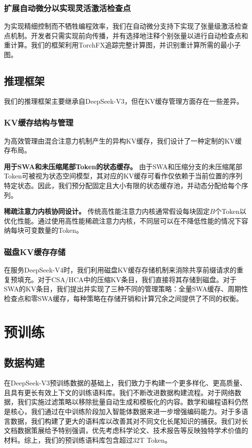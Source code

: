 \documentclass[11pt,a4paper]{article}
\newcommand{\dsvfour}{DeepSeek-V4}
\newcommand{\dsvthree}{DeepSeek-V3}
\begin{document}
\subsubsection{扩展自动微分以实现灵活激活检查点}
为实现精细控制而不牺牲编程效率，我们在自动微分支持下实现了张量级激活检查点机制。开发者只需实现前向传播，并有选择地注释个别张量以进行自动检查点和重计算。我们的框架利用TorchFX追踪完整计算图，并识别重计算所需的最小子图。

\subsection{推理框架}
我们的推理框架主要继承自\dsvthree，但在KV缓存管理方面存在一些差异。

\subsubsection{KV缓存结构与管理}
为高效管理由混合注意力机制产生的异构KV缓存，我们设计了一种定制的KV缓存布局。

\textbf{用于SWA和未压缩尾部Token的状态缓存。} 由于SWA和压缩分支的未压缩尾部Token可被视为状态空间模型，其对应的KV缓存可看作仅依赖于当前位置的序列特定状态。因此，我们预分配固定且大小有限的状态缓存池，并动态分配给每个序列。

\textbf{稀疏注意力内核协同设计。} 传统高性能注意力内核通常假设每块固定\(B\)个Token以优化性能。通过使用高性能稀疏注意力内核，不同层可以在不降低性能的情况下容纳每块可变数量的Token。

\subsubsection{磁盘KV缓存存储}
在服务\dsvfour 时，我们利用磁盘KV缓存存储机制来消除共享前缀请求的重复预填充。对于CSA/HCA中的压缩KV条目，我们直接将其存储到磁盘。对于SWA的KV条目，我们提出并实现了三种不同的管理策略：全量SWA缓存、周期性检查点和零SWA缓存，每种策略在存储开销和计算冗余之间提供了不同的权衡。

\section{预训练}

\subsection{数据构建}
在\dsvthree 预训练数据的基础上，我们致力于构建一个更多样化、更高质量、且具有更长有效上下文的训练语料库。我们不断改进数据构建流程。对于网络数据，我们实施过滤策略以移除批量自动生成和模板化的内容。数学和编程语料仍然是核心，我们通过在中训练阶段加入智能体数据来进一步增强编码能力。对于多语言数据，我们构建了更大的语料库以改善其对不同文化长尾知识的捕获。我们对长文档数据策展给予特别强调，优先考虑科学论文、技术报告等反映独特学术价值的材料。综上，我们的预训练语料库包含超过32T Token。
\end{document}
